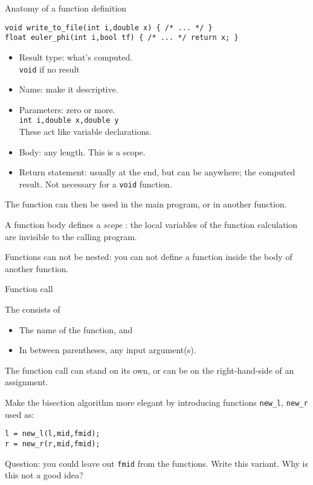 \begin{slide}{Anatomy of a function definition}
  \label{sl:func-anatomy}

\begin{lstlisting}
void write_to_file(int i,double x) { /* ... */ }
float euler_phi(int i,bool tf) { /* ... */ return x; }
\end{lstlisting}

  \begin{itemize}
  \item Result type: what's computed.\\ \lstinline{void} if no result
  \item Name: make it descriptive.
  \item Parameters: zero or more.\\
    \lstinline{int i,double x,double y}\\
    These act like variable declarations.
  \item Body: any length. This is a scope.
  \item Return statement: usually at the end, but can be anywhere; the
    computed result. Not necessary for a \lstinline{void} function.
  \end{itemize}
\end{slide}

The function can then be used in the main program, or in another function.

A function body defines a
\emph{scope}%
:
the local variables of the function calculation are invisible to the
calling program.

Functions can not be nested: you can not define a function inside the
body of another function.

 {Function call}

The  consists of
\begin{itemize}
\item The name of the function, and
\item In between parentheses, any input argument(s).
\end{itemize}
The function call can stand on its own, or can be on the right-hand-side
of an assignment.

\begin{exercise}
  \label{ex:bisect-extend}
  Make the bisection algorithm more elegant
  by introducing functions \lstinline+new_l+, \lstinline+new_r+ used as:
\begin{lstlisting}
l = new_l(l,mid,fmid);
r = new_r(r,mid,fmid);
\end{lstlisting}

Question: you could leave out \lstinline+fmid+ from the functions.
Write this variant. Why is this not a good idea?
\end{exercise}


